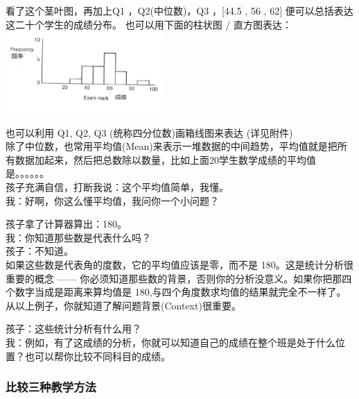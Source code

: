 看了这个茎叶图，再加上Q1 ，Q2(中位数)，Q3 ，{[}44.5 , 56 , 62{]}
便可以总括表达这二十个学生的成绩分布。 也可以用下面的柱状图 /
直方图表达：\\

\includegraphics[width=6cm]{MA_FA1_10.png}

 	
也可以利用 Q1, Q2, Q3 (统称四分位数)画箱线图来表达 (详见附件)\\

除了中位数，也常用平均值(Mean)来表示一堆数据的中间趋势，平均值就是把所有数据加起来，然后把总数除以数量，比如上面20学生数学成绩的平均值是。。。。。。\\
孩子充满自信，打断我说：这个平均值简单，我懂。\\
我：好啊，你这么懂平均值，我问你一个小问题？\\


孩子拿了计算器算出：180。\\
我：你知道那些数是代表什么吗？\\
孩子：不知道。\\
如果这些数是代表角的度数，它的平均值应该是零，而不是
180。这是统计分析很重要的概念 ------
你必须知道那些数的背景，否则你的分析没意义。如果你把那四个数字当成是距离来算均值是
180,与四个角度数求均值的结果就完全不一样了。\\
从以上例子，你就知道了解问题背景(Context)很重要。

孩子：这些统计分析有什么用？\\
我：例如，有了这成绩的分析，你就可以知道自己的成绩在整个班是处于什么位置？也可以帮你比较不同科目的成绩。

\hypertarget{ux6bd4ux8f83ux4e09ux79cdux6559ux5b66ux65b9ux6cd5}{%
\subsubsection{比较三种教学方法}\label{ux6bd4ux8f83ux4e09ux79cdux6559ux5b66ux65b9ux6cd5}}

